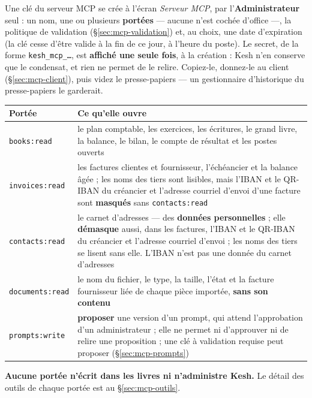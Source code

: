 \documentclass[a4paper,11pt,oneside]{article}
\begin{document}
Une clé du serveur MCP se crée à l'écran \emph{Serveur MCP}, par l'\textbf{Administrateur} seul : un nom, une ou plusieurs \textbf{portées} --- aucune n'est cochée d'office ---, la politique de validation (\S\ref{sec:mcp-validation}) et, au choix, une date d'expiration (la clé cesse d'être valide à la fin de ce jour, à l'heure du poste). Le secret, de la forme \texttt{kesh\_mcp\_\ldots}, est \textbf{affiché une seule fois}, à la création : Kesh n'en conserve que le condensat, et rien ne permet de le relire. Copiez-le, donnez-le au client (\S\ref{sec:mcp-client}), puis videz le presse-papiers --- un gestionnaire d'historique du presse-papiers le garderait.

\begin{center}
\small
\begin{tabular}{p{2.6cm}p{11.6cm}}
\textbf{Portée} & \textbf{Ce qu'elle ouvre} \\
\hline
\texttt{books:read} & le plan comptable, les exercices, les écritures, le grand livre, la balance, le bilan, le compte de résultat et les postes ouverts \\
\texttt{invoices:read} & les factures clientes et fournisseur, l'échéancier et la balance âgée ; les noms des tiers sont lisibles, mais l'IBAN et le QR-IBAN du créancier et l'adresse courriel d'envoi d'une facture sont \textbf{masqués} sans \texttt{contacts:read} \\
\texttt{contacts:read} & le carnet d'adresses --- des \textbf{données personnelles} ; elle \textbf{démasque} aussi, dans les factures, l'IBAN et le QR-IBAN du créancier et l'adresse courriel d'envoi ; les noms des tiers se lisent sans elle. L'IBAN n'est pas une donnée du carnet d'adresses \\
\texttt{documents:read} & le nom du fichier, le type, la taille, l'état et la facture fournisseur liée de chaque pièce importée, \textbf{sans son contenu} \\
\texttt{prompts:write} & \textbf{proposer} une version d'un prompt, qui attend l'approbation d'un administrateur ; elle ne permet ni d'approuver ni de relire une proposition ; une clé à validation requise peut proposer (\S\ref{sec:mcp-prompts}) \\
\end{tabular}
\end{center}

\textbf{Aucune portée n'écrit dans les livres ni n'administre Kesh.} Le détail des outils de chaque portée est au \S\ref{sec:mcp-outils}.
\end{document}
